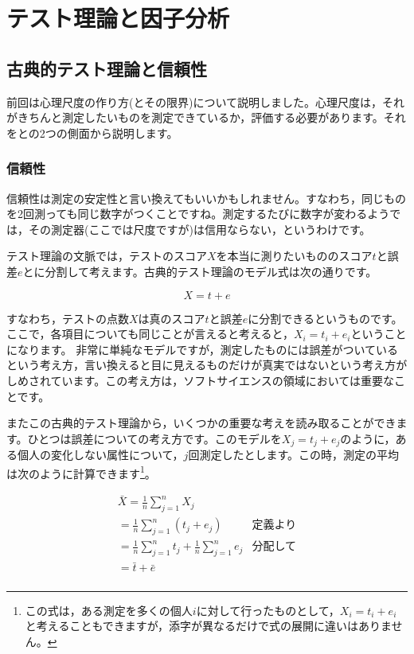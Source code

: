 \documentclass{ltjsbook}
\begin{document}
\chapter{テスト理論と因子分析}
\label{x03_testTheory}

\section{古典的テスト理論と信頼性}

前回は心理尺度の作り方(とその限界)について説明しました。心理尺度は，それがきちんと測定したいものを測定できているか，評価する必要があります。それをとの2つの側面から説明します。

\subsection{信頼性}
信頼性は測定の安定性と言い換えてもいいかもしれません。すなわち，同じものを2回測っても同じ数字がつくことですね。測定するたびに数字が変わるようでは，その測定器(ここでは尺度ですが)は信用ならない，というわけです。

テスト理論の文脈では，テストのスコア$X$を本当に測りたいもののスコア$t$と誤差$e$とに分割して考えます。古典的テスト理論のモデル式は次の通りです。

\[ X = t + e \]

すなわち，テストの点数$X$は真のスコア$t$と誤差$e$に分割できるというものです。ここで，各項目についても同じことが言えると考えると，$X_i = t_i + e_i$ということになります。
非常に単純なモデルですが，測定したものには誤差がついているという考え方，言い換えると目に見えるものだけが真実ではないという考え方がしめされています。この考え方は，ソフトサイエンスの領域においては重要なことです。

またこの古典的テスト理論から，いくつかの重要な考えを読み取ることができます。ひとつは誤差についての考え方です。このモデルを$X_j = t_j + e_j$のように，ある個人の変化しない属性について，$j$回測定したとします。この時，測定の平均は次のように計算できます\footnote{この式は，ある測定を多くの個人$i$に対して行ったものとして，$X_i = t_i + e_i$と考えることもできますが，添字が異なるだけで式の展開に違いはありません。}。

\begin{align*}
	 & \bar{X}  =  \frac{1}{n}\sum_{j=1}^n X_j                           &             & \mbox{} \\
	 & =  \frac{1}{n}\sum_{j=1}^n (t_j + e_j)                            & \mbox{定義より}           \\
	 & =  \frac{1}{n} \sum_{j=1}^n  t_j +  \frac{1}{n} \sum_{j=1}^n  e_j & \mbox{分配して}           \\
	 & =  \bar{t} + \bar{e}                                              & \mbox{}               \\
\end{align*}
\end{document}

